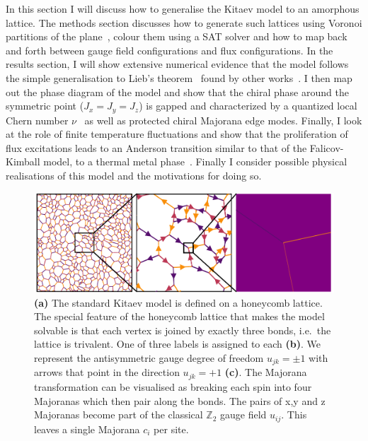 In this section I will discuss how to generalise the Kitaev model to an amorphous lattice. The methods section discusses how to generate such lattices using Voronoi partitions of the plane~\autocite{mitchellAmorphousTopologicalInsulators2018,marsalTopologicalWeaireThorpeModels2020}, colour them using a SAT solver and how to map back and forth between gauge field configurations and flux configurations. In the results section, I will show extensive numerical evidence that the model follows the simple generalisation to Lieb's theorem~\autocite{lieb_flux_1994} found by other works~\autocite{eschmannThermodynamicClassificationThreedimensional2020,Yao2009,eschmann2019thermodynamics,Peri2020}. I then map out the phase diagram of the model and show that the chiral phase around the symmetric point (\(J_x = J_y = J_z\)) is gapped and characterized by a quantized local Chern number \(\nu\)~\autocite{peru_preprint,mitchellAmorphousTopologicalInsulators2018} as well as protected chiral Majorana edge modes. Finally, I look at the role of finite temperature fluctuations and show that the proliferation of flux excitations leads to an Anderson transition similar to that of the Falicov-Kimball model, to a thermal metal phase~\autocite{Laumann2012,lahtinenTopologicalLiquidNucleation2012,selfThermallyInducedMetallic2019}. Finally I consider possible physical realisations of this model and the motivations for doing so.

\hypertarget{fig:amk_zoom}{%
\begin{figure}
\centering
\includegraphics[width=1\textwidth,height=\textheight]{figure_code/amk_chapter/intro/amk_zoom/amk_zoom}
\caption[{The Kitaev Honeycomb Model}]{\textbf{(a)} The standard Kitaev model is defined on a honeycomb lattice. The special feature of the honeycomb lattice that makes the model solvable is that each vertex is joined by exactly three bonds, i.e.~the lattice is trivalent. One of three labels is assigned to each \textbf{(b)}. We represent the antisymmetric gauge degree of freedom \(u_{jk} = \pm 1\) with arrows that point in the direction \(u_{jk} = +1\) \textbf{(c)}. The Majorana transformation can be visualised as breaking each spin into four Majoranas which then pair along the bonds. The pairs of x,y and z Majoranas become part of the classical \(\mathbb{Z}_2\) gauge field \(u_{ij}\). This leaves a single Majorana \(c_i\) per site.}
\label{fig:amk_zoom}
\end{figure}
}

